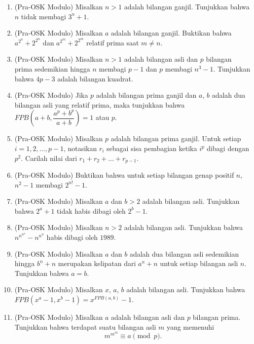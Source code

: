 \documentclass[12pt]{scrartcl}
\begin{document}
\begin{enumerate}[resume]
	\item (Pra-OSK Modulo)
	Misalkan $n > 1$ adalah bilangan ganjil. Tunjukkan bahwa $n$ tidak membagi $3^n + 1$.

	\item (Pra-OSK Modulo)
	Misalkan $a$ adalah bilangan ganjil.
	Buktikan bahwa $a^{2^n} + 2^{2^n}$ dan $a^{2^m} + 2^{2^m}$ relatif prima saat $m \ne n$.

	\item (Pra-OSK Modulo)
	Misalkan $n > 1$ adalah bilangan asli dan $p$ bilangan prima sedemikian hingga
	$n$ membagi $p - 1$ dan $p$ membagi $n^3 - 1$.
	Tunjukkan bahwa $4p - 3$ adalah bilangan kuadrat.

	\item (Pra-OSK Modulo)
	Jika $p$ adalah bilangan prima ganjil dan $a$, $b$ adalah dua bilangan asli yang relatif prima,
	maka tunjukkan bahwa $FPB\left(a + b, \dfrac{a^p + b^p}{a + b}\right) = 1$ atau $p$.

	\item (Pra-OSK Modulo)
	Misalkan $p$ adalah bilangan prima ganjil.
	Untuk setiap $i = 1, 2, \ldots, p - 1$, notasikan $r_i$ sebagai sisa pembagian
	ketika $i^p$ dibagi dengan $p^2$.
	Carilah nilai dari $r_1 + r_2 + \dots + r_{p - 1}$.

	\item (Pra-OSK Modulo)
	Buktikan bahwa untuk setiap bilangan genap positif $n$,
	$n^2 - 1$ membagi $2^{n!} - 1$.

	\item (Pra-OSK Modulo)
	Misalkan $a$ dan $b > 2$ adalah bilangan asli.
	Tunjukkan bahwa $2^a + 1$ tidak habis dibagi oleh $2^b - 1$.

	\item (Pra-OSK Modulo)
	Misalkan $n > 2$ adalah bilangan asli.
	Tunjukkan bahwa $n^{n^{n^n}} - n^{n^n}$ habis dibagi oleh $1989$.

	\item (Pra-OSK Modulo)
	Misalkan $a$ dan $b$ adalah dua bilangan asli sedemikian hingga $b^n + n$
	merupakan kelipatan dari $a^n + n$ untuk setiap bilangan asli $n$.
	Tunjukkan bahwa $a = b$.

	\item (Pra-OSK Modulo)
	Misalkan $x$, $a$, $b$ adalah bilangan asli.
	Tunjukkan bahwa $FPB(x^a - 1, x^b - 1) = x^{FPB(a, b)} - 1$.

	\item (Pra-OSK Modulo)
	Misalkan $a$ adalah bilangan asli dan $p$ bilangan prima.
	Tunjukkan bahwa terdapat suatu bilangan asli $m$ yang memenuhi
	\[ m^{m^m} \equiv a \pmod{p}. \]

\end{enumerate}
\end{document}
